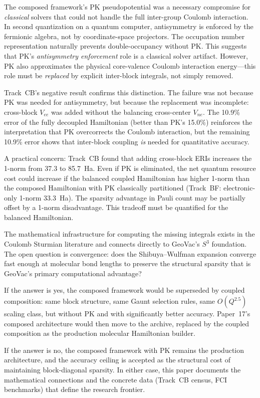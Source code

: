 \documentclass[aps,pra,twocolumn,superscriptaddress,longbibliography]{revtex4-2}
\begin{document}
The composed framework's PK pseudopotential was a necessary compromise
for \emph{classical} solvers that could not handle the full
inter-group Coulomb interaction.  In second quantization on a quantum
computer, antisymmetry is enforced by the fermionic algebra, not by
coordinate-space projectors.  The occupation number representation
naturally prevents double-occupancy without PK.  This suggests that
PK's \emph{antisymmetry enforcement} role is a classical solver
artifact.  However, PK also approximates the physical core-valence
Coulomb interaction energy---this role must be \emph{replaced} by
explicit inter-block integrals, not simply removed.

Track~CB's negative result confirms this distinction.  The failure
was not because PK was needed for antisymmetry, but because the
replacement was incomplete: cross-block $V_{ee}$ was added without
the balancing cross-center $V_{ne}$.  The 10.9\% error of the fully
decoupled Hamiltonian (better than PK's 15.0\%) reinforces the
interpretation that PK overcorrects the Coulomb interaction, but the
remaining 10.9\% error shows that inter-block coupling \emph{is}
needed for quantitative accuracy.

A practical concern: Track~CB found that adding cross-block ERIs
increases the 1-norm from 37.3 to 85.7~Ha.  Even if PK is
eliminated, the net quantum resource cost could increase if the
balanced coupled Hamiltonian has higher 1-norm than the composed
Hamiltonian with PK classically partitioned (Track~BF: electronic-only
1-norm 33.3~Ha).  The sparsity advantage in Pauli count may be
partially offset by a 1-norm disadvantage.  This tradeoff must be
quantified for the balanced Hamiltonian.

The mathematical infrastructure for computing the missing integrals
exists in the Coulomb Sturmian literature and connects directly to
GeoVac's $S^3$ foundation.  The open question is convergence: does
the Shibuya--Wulfman expansion converge fast enough at molecular bond
lengths to preserve the structural sparsity that is GeoVac's primary
computational advantage?

If the answer is yes, the composed framework would be superseded by
coupled composition: same block structure, same Gaunt selection
rules, same $O(Q^{2.5})$ scaling class, but without PK and with
significantly better accuracy.  Paper~17's composed architecture
would then move to the archive, replaced by the coupled composition
as the production molecular Hamiltonian builder.

If the answer is no, the composed framework with PK remains the
production architecture, and the accuracy ceiling is accepted as the
structural cost of maintaining block-diagonal sparsity.  In either
case, this paper documents the mathematical connections and the
concrete data (Track~CB census, FCI benchmarks) that define the
research frontier.
\end{document}
